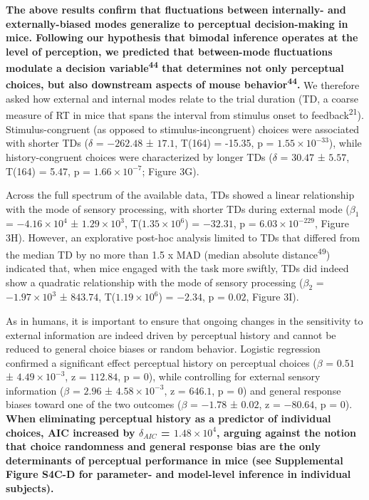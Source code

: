 \documentclass[
]{article}
\begin{document}
\textbf{The above results confirm that fluctuations between internally-
and externally-biased modes generalize to perceptual decision-making in
mice. Following our hypothesis that bimodal inference operates at the
level of perception, we predicted that between-mode fluctuations
modulate a decision variable\textsuperscript{44} that determines not
only perceptual choices, but also downstream aspects of mouse
behavior\textsuperscript{44}.} We therefore asked how external and
internal modes relate to the trial duration (TD, a coarse measure of RT
in mice that spans the interval from stimulus onset to
feedback\textsuperscript{21}). Stimulus-congruent (as opposed to
stimulus-incongruent) choices were associated with shorter TDs
(\(\delta\) = \(-262.48\) ± \(17.1\), T(164) = -15.35, p =
\(\ensuremath{1.55\times 10^{-33}}\)), while history-congruent choices
were characterized by longer TDs (\(\delta\) = \(30.47\) ± \(5.57\),
T(164) = 5.47, p = \(\ensuremath{1.66\times 10^{-7}}\); Figure 3G).

Across the full spectrum of the available data, TDs showed a linear
relationship with the mode of sensory processing, with shorter TDs
during external mode (\(\beta_1\) = \(\ensuremath{-4.16\times 10^{4}}\)
± \(\ensuremath{1.29\times 10^{3}}\),
T(\(\ensuremath{1.35\times 10^{6}}\)) = \(-32.31\), p =
\(\ensuremath{6.03\times 10^{-229}}\), Figure 3H). However, an
explorative post-hoc analysis limited to TDs that differed from the
median TD by no more than 1.5 x MAD (median absolute
distance\textsuperscript{49}) indicated that, when mice engaged with the
task more swiftly, TDs did indeed show a quadratic relationship with the
mode of sensory processing (\(\beta_2\) =
\(\ensuremath{-1.97\times 10^{3}}\) ± \(843.74\),
T(\(\ensuremath{1.19\times 10^{6}}\)) = \(-2.34\), p = \(0.02\), Figure
3I).

As in humans, it is important to ensure that ongoing changes in the
sensitivity to external information are indeed driven by perceptual
history and cannot be reduced to general choice biases or random
behavior. Logistic regression confirmed a significant effect perceptual
history on perceptual choices (\(\beta\) = \(0.51\) ±
\(\ensuremath{4.49\times 10^{-3}}\), z = \(112.84\), p = \(0\)), while
controlling for external sensory information (\(\beta\) = \(2.96\) ±
\(\ensuremath{4.58\times 10^{-3}}\), z = \(646.1\), p = \(0\)) and
general response biases toward one of the two outcomes (\(\beta\) =
\(-1.78\) ± \(0.02\), z = \(-80.64\), p = \(0\)). \textbf{When
eliminating perceptual history as a predictor of individual choices, AIC
increased by \(\delta_{AIC}\) = \(\ensuremath{1.48\times 10^{4}}\),
arguing against the notion that choice randomness and general response
bias are the only determinants of perceptual performance in mice (see
Supplemental Figure S4C-D for parameter- and model-level inference in
individual subjects).}
\end{document}
